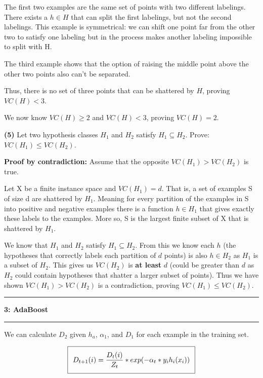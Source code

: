\documentclass[11pt]{article}
\newcommand\question[2]{\vspace{.25in}\hrule\textbf{#1: #2}\vspace{.5em}\hrule\vspace{.10in}}
\renewcommand\part[1]{\vspace{.10in}\textbf{(#1)}}
\begin{document}
The first two examples are the same set of points with two different labelings. There exists a $h \in H$ that can split the first labelings, but not the second labelings. This example is symmetrical: we can shift one point far from the other two to satisfy one labeling but in the process makes another labeling impossible to split with H.

The third example shows that the option of raising the middle point above the other two points also can't be separated.

Thus, there is no set of three points that can be shattered by $H$, proving $VC(H) < 3$.

We now know $VC(H) \geq 2$ and $VC(H) < 3$, proving $VC(H) = 2$.


\part{5} Let two hypothesis classes $H_1$ and $H_2$ satisfy $H_1 \subseteq H_2$. Prove: $VC(H_1) \leq VC(H_2)$.

\textbf{Proof by contradiction:} Assume that the opposite $VC(H_1) > VC(H_2)$ is true.

Let X be a finite instance space and $VC(H_1) = d$. That is, a set of examples S of size d are shattered by $H_1$. Meaning for every partition of the examples in S into positive and negative examples there is a function  $h \in H_1$ that gives exactly these labels to the examples. More so, S is the largest finite subset of X that is shattered by $H_1$.

We know that $H_1$ and $H_2$ satisfy $H_1 \subseteq H_2$. From this we know each $h$ (the hypotheses that correctly labels each partition of $d$ points) is also $h \in H_2$ as $H_1$ is a subset of $H_2$. This gives us $VC(H_2)$ is \textbf{at least} $d$ (could be greater than $d$ as $H_2$ could contain hypotheses that shatter a larger subset of points). Thus we have shown $VC(H_1) > VC(H_2)$ is a contradiction, proving $VC(H_1) \leq VC(H_2)$.

\question{3}{AdaBoost}
We can calculate $D_2$ given $h_a$, $\alpha_1$, and $D_1$ for each example in the training set.

\begin{equation}
\setlength\fboxsep{0.25cm}
\setlength\fboxrule{0.4pt}
\boxed{D_{t+1}(i) = \frac{D_t(i)}{Z_t} * exp(-\alpha_t * y_ih_i(x_i))}
\end{equation}
\end{document}
